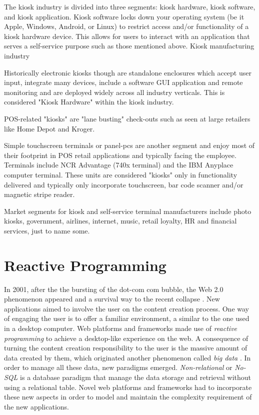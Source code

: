 The kiosk industry is divided into three segments: kiosk hardware, kiosk software, and kiosk application. Kiosk software locks down your operating system (be it Apple, Windows, Android, or Linux) to restrict access and/or functionality of a kiosk hardware device. This allows for users to interact with an application that serves a self-service purpose such as those mentioned above.
Kiosk manufacturing industry

Historically electronic kiosks though are standalone enclosures which accept user input, integrate many devices, include a software GUI application and remote monitoring and are deployed widely across all industry verticals. This is considered "Kiosk Hardware" within the kiosk industry.

POS-related "kiosks" are "lane busting" check-outs such as seen at large retailers like Home Depot and Kroger.

Simple touchscreen terminals or panel-pcs are another segment and enjoy most of their footprint in POS retail applications and typically facing the employee. Terminals include NCR Advantage (740x terminal) and the IBM Anyplace computer terminal. These units are considered "kiosks" only in functionality delivered and typically only incorporate touchscreen, bar code scanner and/or magnetic stripe reader.

Market segments for kiosk and self-service terminal manufacturers include photo kiosks, government, airlines, internet, music, retail loyalty, HR and financial services, just to name some.
\cite{kelsen2012unleashing}


\section{Reactive Programming}

In 2001, after the the bursting of the dot-com com bubble, the Web 2.0 phenomenon appeared and a survival way to the recent collapse \cite{oreilly2005}.
New applications aimed to involve the user on the content creation process.
One way of engaging the user is to offer a familiar environment, a similar to the one used in a desktop computer.
Web platforms and frameworks made use of \emph{reactive programming} \cite{reactive2014} to achieve a desktop-like experience on the web.
A consequence of turning the content creation responsibility to the user is the massive amount of data created by them, which originated another phenomenon called \emph{big data} \cite{SharmaTWGS14}.
In order to manage all these data, new paradigms emerged.
\emph{Non-relational} or \emph{No-SQL} \cite{Strauch12} is a database paradigm that manage the data storage and retrieval without using a relational table.
Novel web platforms and frameworks had to incorporate these new aspects in order to model and maintain the complexity requirement of the new applications.


